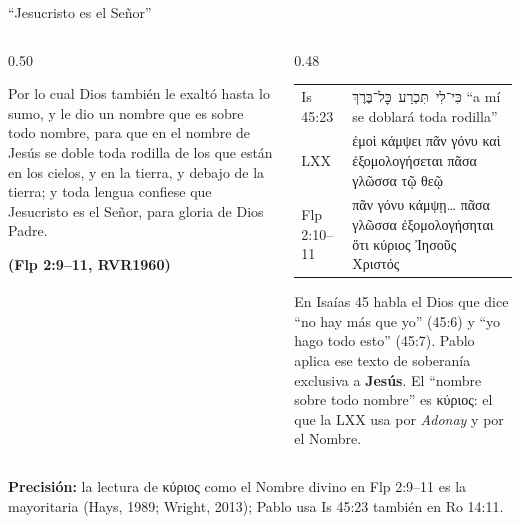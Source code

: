 \documentclass[hyperref={bookmarks=false},aspectratio=169]{beamer}
\newcommand{\heb}[1]{\mbox{\foreignlanguage{hebrew}{#1}}}
\newcommand{\grc}[1]{\foreignlanguage{ancientgreek}{#1}}
\newcommand{\fuente}[1]{\par\hfill{\upshape\bfseries\footnotesize\textcolor{azul}{#1}}}
\newcommand{\destacar}[1]{\textbf{\textcolor{azul}{#1}}}
\newcommand{\precision}[1]{{\footnotesize\color{gris}\textbf{Precisión:} #1}}
\begin{document}
\begin{frame}{``Jesucristo es el Señor''}
\begin{columns}[t,onlytextwidth]
\begin{column}{0.50\textwidth}
\begin{cita}Por lo cual Dios también le exaltó hasta lo sumo, y le dio un nombre que es sobre todo nombre, para que en el nombre de Jesús se doble toda rodilla de los que están en los cielos, y en la tierra, y debajo de la tierra; y toda lengua confiese que Jesucristo es el Señor, para gloria de Dios Padre.\fuente{(Flp 2:9--11, RVR1960)}\end{cita}
\end{column}
\begin{column}{0.48\textwidth}
\scriptsize\renewcommand{\arraystretch}{1.15}
\begin{tabular}{@{}>{\RaggedRight\arraybackslash}p{1.4cm}>{\RaggedRight\arraybackslash}p{4.2cm}@{}}
\toprule
Is 45:23 & \heb{כִּי־לִי תִּכְרַע כׇּל־בֶּרֶךְ} ``a mí se doblará toda rodilla'' \\
LXX & \grc{ἐμοὶ κάμψει πᾶν γόνυ καὶ ἐξομολογήσεται πᾶσα γλῶσσα τῷ θεῷ} \\
Flp 2:10--11 & \grc{πᾶν γόνυ κάμψῃ\ldots{} πᾶσα γλῶσσα ἐξομολογήσηται ὅτι κύριος Ἰησοῦς Χριστός} \\
\bottomrule
\end{tabular}\par\smallskip
\small En Isaías 45 habla el Dios que dice ``no hay más que yo'' (45:6) y ``yo hago todo esto'' (45:7). Pablo aplica ese texto de soberanía exclusiva a \destacar{Jesús}. El ``nombre sobre todo nombre'' es \grc{κύριος}: el que la LXX usa por \emph{Adonay} y por el Nombre.
\end{column}
\end{columns}\par\smallskip
\precision{la lectura de \grc{κύριος} como el Nombre divino en Flp 2:9--11 es la mayoritaria (Hays, 1989; Wright, 2013); Pablo usa Is 45:23 también en Ro 14:11.}
\end{frame}
\end{document}
